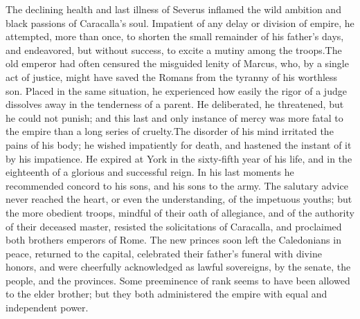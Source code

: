 The declining health and last illness of Severus inflamed the
wild ambition and black passions of Caracalla’s soul. Impatient
of any delay or division of empire, he attempted, more than once,
to shorten the small remainder of his father’s days, and
endeavored, but without success, to excite a mutiny among the
troops.\footnotemark[15] The old emperor had often censured the misguided
lenity of Marcus, who, by a single act of justice, might have
saved the Romans from the tyranny of his worthless son. Placed in
the same situation, he experienced how easily the rigor of a
judge dissolves away in the tenderness of a parent. He
deliberated, he threatened, but he could not punish; and this
last and only instance of mercy was more fatal to the empire than
a long series of cruelty.\footnotemark[16] The disorder of his mind irritated
the pains of his body; he wished impatiently for death, and
hastened the instant of it by his impatience. He expired at York
in the sixty-fifth year of his life, and in the eighteenth of a
glorious and successful reign. In his last moments he recommended
concord to his sons, and his sons to the army. The salutary
advice never reached the heart, or even the understanding, of the
impetuous youths; but the more obedient troops, mindful of their
oath of allegiance, and of the authority of their deceased
master, resisted the solicitations of Caracalla, and proclaimed
both brothers emperors of Rome. The new princes soon left the
Caledonians in peace, returned to the capital, celebrated their
father’s funeral with divine honors, and were cheerfully
acknowledged as lawful sovereigns, by the senate, the people, and
the provinces. Some preeminence of rank seems to have been
allowed to the elder brother; but they both administered the
empire with equal and independent power.\footnotemark[17]




